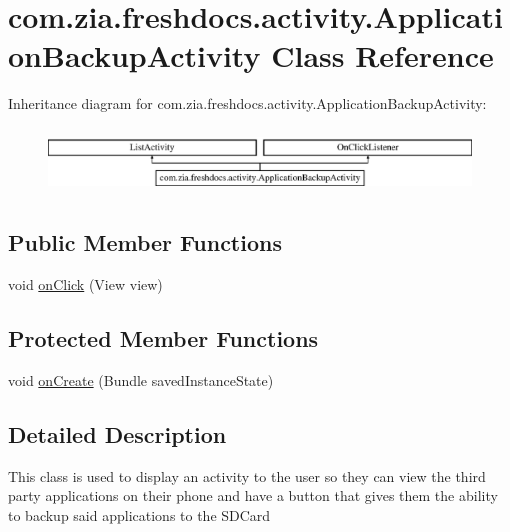 \hypertarget{classcom_1_1zia_1_1freshdocs_1_1activity_1_1_application_backup_activity}{\section{com.\-zia.\-freshdocs.\-activity.\-Application\-Backup\-Activity Class Reference}
\label{classcom_1_1zia_1_1freshdocs_1_1activity_1_1_application_backup_activity}
}
Inheritance diagram for com.\-zia.\-freshdocs.\-activity.\-Application\-Backup\-Activity\-:\begin{figure}[H]
\begin{center}
\leavevmode
\includegraphics[height=1.761006cm]{classcom_1_1zia_1_1freshdocs_1_1activity_1_1_application_backup_activity}
\end{center}
\end{figure}
\subsection*{Public Member Functions}
\begin{DoxyCompactItemize}
\item 
void \hyperlink{classcom_1_1zia_1_1freshdocs_1_1activity_1_1_application_backup_activity_a53c3fad41695f40d1c4ec8868c9334af}{on\-Click} (View view)
\end{DoxyCompactItemize}
\subsection*{Protected Member Functions}
\begin{DoxyCompactItemize}
\item 
void \hyperlink{classcom_1_1zia_1_1freshdocs_1_1activity_1_1_application_backup_activity_ab8a94d3a79bd10f61ef681aec39d505f}{on\-Create} (Bundle saved\-Instance\-State)
\end{DoxyCompactItemize}


\subsection{Detailed Description}
This class is used to display an activity to the user so they can view the third party applications on their phone and have a button that gives them the ability to backup said applications to the S\-D\-Card \par
 

